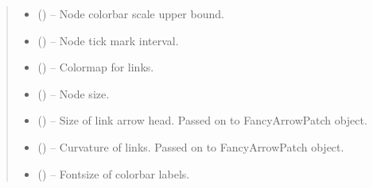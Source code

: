 \documentclass[letterpaper,10pt,english]{sphinxmanual}
\begin{document}
\begin{fulllineitems}
\begin{quote}
\begin{description}
\begin{itemize}
\item {} 
 (\sphinxstyleliteralemphasis{, }\sphinxstyleliteralemphasis{ (}\sphinxstyleliteralemphasis{)}\sphinxstyleliteralemphasis{}) -- Node colorbar scale upper bound.

\item {} 
 (\sphinxstyleliteralemphasis{, }\sphinxstyleliteralemphasis{ (}\sphinxstyleliteralemphasis{)}\sphinxstyleliteralemphasis{}) -- Node tick mark interval.

\item {} 
 (\sphinxstyleliteralemphasis{, }\sphinxstyleliteralemphasis{ (}\sphinxstyleliteralemphasis{)}\sphinxstyleliteralemphasis{}) -- Colormap for links.

\item {} 
 (\sphinxstyleliteralemphasis{, }\sphinxstyleliteralemphasis{ (}\sphinxstyleliteralemphasis{)}\sphinxstyleliteralemphasis{}) -- Node size.

\item {} 
 (\sphinxstyleliteralemphasis{, }\sphinxstyleliteralemphasis{ (}\sphinxstyleliteralemphasis{)}\sphinxstyleliteralemphasis{}) -- Size of link arrow head. Passed on to FancyArrowPatch object.

\item {} 
\sphinxstyleliteralstrong{, }\sphinxstyleliteralstrong{ (} (\sphinxstyleliteralemphasis{,}\sphinxstyleliteralemphasis{}) -- Curvature of links. Passed on to FancyArrowPatch object.

\item {} 
 (\sphinxstyleliteralemphasis{, }\sphinxstyleliteralemphasis{ (}\sphinxstyleliteralemphasis{)}\sphinxstyleliteralemphasis{}) -- Fontsize of colorbar labels.


\end{itemize}
\end{description}
\end{quote}
\end{fulllineitems}
\end{document}
